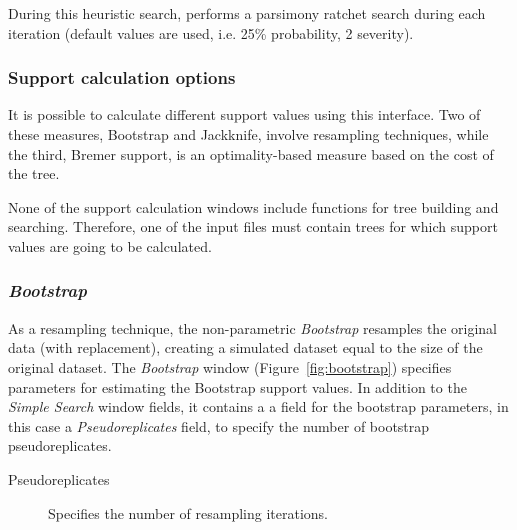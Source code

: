 {During this heuristic search, \poy performs a parsimony ratchet search during each iteration (default values are used, i.e. 25\% probability, 2 severity).

\subsubsection{Support calculation options}

It is possible to calculate different support values using this interface.  Two of these measures, Bootstrap and Jackknife, involve resampling techniques, while the third, Bremer support, is an optimality-based measure based on the cost of the tree. 

None of the support calculation windows include functions for tree building and searching. Therefore, one of the input files must contain trees for which support values are going to be calculated.

\subsubsection*{\emph{Bootstrap}}

As a resampling technique, the non-parametric \emph{Bootstrap} resamples the original data (with replacement), creating a simulated dataset equal to the size of the original dataset. The \emph{Bootstrap} window (Figure~\ref{fig:bootstrap}) specifies parameters for estimating the Bootstrap support values. In addition to the \emph{Simple Search} window fields, it contains a a field for the bootstrap parameters, in this case a \emph{Pseudoreplicates} field, to specify the number of bootstrap pseudoreplicates.

\begin{description}
    \item[Pseudoreplicates] Specifies the number of resampling iterations.
\end{description}

}
